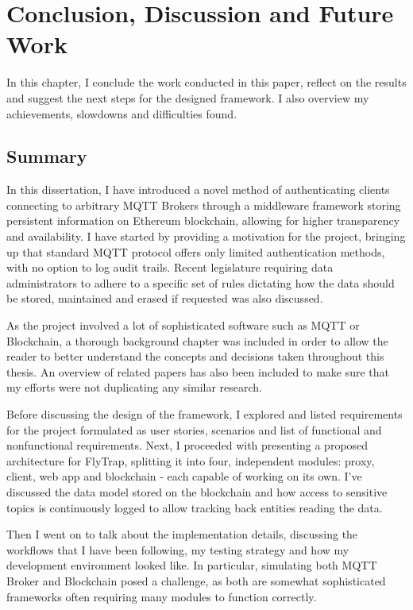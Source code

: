 \chapter{Conclusion, Discussion and Future Work\label{chap:discussion}}
In this chapter, I conclude the work conducted in this paper, reflect on the results and suggest the next steps for the designed framework. I also overview my achievements, slowdowns and difficulties found.

\section{Summary}
In this dissertation, I have introduced a novel method of authenticating clients connecting to arbitrary MQTT Brokers through a middleware framework storing persistent information on Ethereum blockchain, allowing for higher transparency and availability. I have started by providing a motivation for the project, bringing up that standard MQTT protocol offers only limited authentication methods, with no option to log audit trails. Recent legislature requiring data administrators to adhere to a specific set of rules dictating how the data should be stored, maintained and erased if requested was also discussed.

As the project involved a lot of sophisticated software such as MQTT or Blockchain, a thorough background chapter was included in order to allow the reader to better understand the concepts and decisions taken throughout this thesis. An overview of related papers has also been included to make sure that my efforts were not duplicating any similar research.

Before discussing the design of the framework, I explored and listed requirements for the project formulated as user stories, scenarios and list of functional and nonfunctional requirements. Next, I proceeded with presenting a proposed architecture for FlyTrap, splitting it into four, independent modules: proxy, client, web app and blockchain - each capable of working on its own. I've discussed the data model stored on the blockchain and how access to sensitive topics is continuously logged to allow tracking back entities reading the data.

Then I went on to talk about the implementation details, discussing the workflows that I have been following, my testing strategy and how my development environment looked like. In particular, simulating both MQTT Broker and Blockchain posed a challenge, as both are somewhat sophisticated frameworks often requiring many modules to function correctly.

